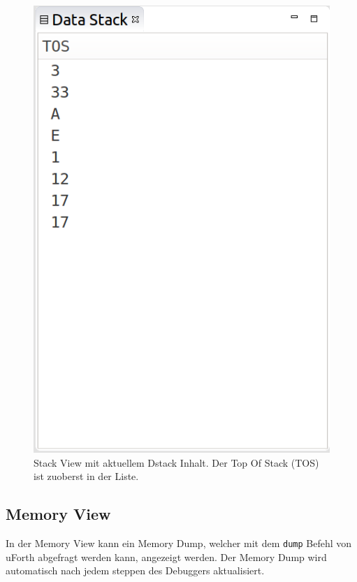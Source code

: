 \begin{figure}[H]
	\centering
		\includegraphics[scale=0.35]{debugger/stack.png}
		\caption{Stack View mit aktuellem Dstack Inhalt. Der Top Of Stack (TOS) ist zuoberst in der Liste.}
		\label{fig:stack}
\end{figure}


\subsection{Memory View}

In der Memory View kann ein Memory Dump, welcher mit dem \verb!dump! Befehl von uForth abgefragt werden kann, angezeigt werden. Der Memory Dump wird automatisch nach jedem steppen des Debuggers aktualisiert.

